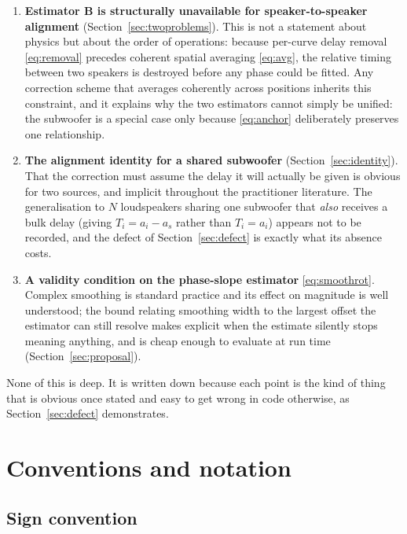 \documentclass[11pt,a4paper]{article}
\begin{document}
\begin{enumerate}[leftmargin=*]
\item \textbf{Estimator B is structurally unavailable for speaker-to-speaker
  alignment} (Section~\ref{sec:twoproblems}). This is not a statement about
  physics but about the order of operations: because per-curve delay removal
  \eqref{eq:removal} precedes coherent spatial averaging \eqref{eq:avg}, the
  relative timing between two speakers is destroyed before any phase could be
  fitted. Any correction scheme that averages coherently across positions
  inherits this constraint, and it explains why the two estimators cannot simply
  be unified: the subwoofer is a special case only because
  \eqref{eq:anchor} deliberately preserves one relationship.

\item \textbf{The alignment identity for a shared subwoofer}
  (Section~\ref{sec:identity}). That the correction must assume the delay it
  will actually be given is obvious for two sources, and implicit throughout the
  practitioner literature. The generalisation to $N$ loudspeakers sharing one
  subwoofer that \emph{also} receives a bulk delay (giving
  $T_i = a_i - a_s$ rather than $T_i = a_i$) appears not to be recorded, and
  the defect of Section~\ref{sec:defect} is exactly what its absence costs.

\item \textbf{A validity condition on the phase-slope estimator}
  \eqref{eq:smoothrot}. Complex smoothing is standard practice and its effect on
  magnitude is well understood; the bound relating smoothing width to the
  largest offset the estimator can still resolve makes explicit when the
  estimate silently stops meaning anything, and is cheap enough to evaluate at
  run time (Section~\ref{sec:proposal}).
\end{enumerate}

None of this is deep. It is written down because each point is the kind of thing
that is obvious once stated and easy to get wrong in code otherwise, as
Section~\ref{sec:defect} demonstrates.

\section{Conventions and notation}

\subsection{Sign convention}
\end{document}
